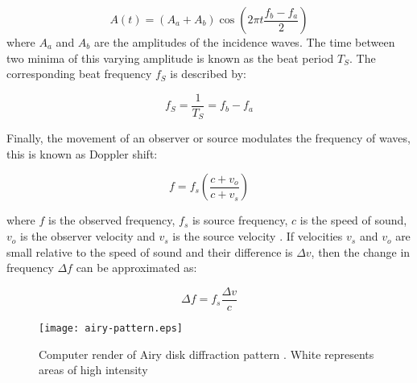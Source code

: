\documentclass[a4paper,10pt,journal]{IEEEtran}
\begin{document}
\begin{equation}
\label{eq:amplitude}
	A(t) = (A_a + A_b) \cos(2\pi t \frac{f_b - f_a}{2})
\end{equation}
where $A_a$ and $A_b$ are the amplitudes of the incidence waves. The time between two minima of this varying amplitude is known as the beat period $T_S$. The corresponding beat frequency $f_S$ is described by:

\begin{equation}
\label{eq:beat-freq}
	f_S = \frac{1}{T_S} = f_b - f_a
\end{equation}

Finally, the movement of an observer or source modulates the frequency of waves, this is known as Doppler shift:

\begin{equation}
\label{eq:doppler}
	f = f_s(\frac{c+v_o}{c+v_s})
\end{equation}

where $f$ is the observed frequency, $f_s$ is source frequency, $c$ is the speed of sound, $v_o$ is the observer velocity and $v_s$ is the source velocity \cite{young-book}.
If velocities $v_s$ and $v_o$ are small relative to the speed of sound and their difference is $\Delta v$, then the change in frequency $\Delta f$ can be approximated as:

\begin{equation}
\label{eq:doppler-approx}
	\Delta f = f_s \frac{\Delta v}{c}
\end{equation}

\begin{figure}
	\centering
	\texttt{[image: airy-pattern.eps]}
	\caption{Computer render of Airy disk diffraction pattern \cite{airy-pattern}. White represents areas of high intensity}
	\label{airy-pattern}
\end{figure}
\end{document}

